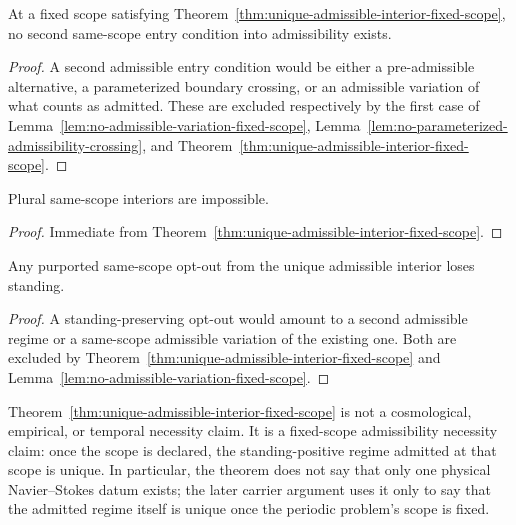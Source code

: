 \begin{corollary}\label{cor:no-alternative-entry-condition}
At a fixed scope satisfying Theorem~\ref{thm:unique-admissible-interior-fixed-scope}, no second same-scope entry condition into admissibility exists.
\end{corollary}

\begin{proof}
A second admissible entry condition would be either a pre-admissible alternative, a parameterized boundary crossing, or an admissible variation of what counts as admitted. These are excluded respectively by the first case of Lemma~\ref{lem:no-admissible-variation-fixed-scope}, Lemma~\ref{lem:no-parameterized-admissibility-crossing}, and Theorem~\ref{thm:unique-admissible-interior-fixed-scope}.
\end{proof}

\begin{corollary}\label{cor:no-plural-admissible-interiors}
Plural same-scope interiors are impossible.
\end{corollary}

\begin{proof}
Immediate from Theorem~\ref{thm:unique-admissible-interior-fixed-scope}.
\end{proof}

\begin{corollary}\label{cor:no-standing-preserving-optout}
Any purported same-scope opt-out from the unique admissible interior loses standing.
\end{corollary}

\begin{proof}
A standing-preserving opt-out would amount to a second admissible regime or a same-scope admissible variation of the existing one. Both are excluded by Theorem~\ref{thm:unique-admissible-interior-fixed-scope} and Lemma~\ref{lem:no-admissible-variation-fixed-scope}.
\end{proof}

\begin{remark}\label{rem:interpretive-boundary-fixed-scope}
Theorem~\ref{thm:unique-admissible-interior-fixed-scope} is not a cosmological, empirical, or temporal necessity claim. It is a fixed-scope admissibility necessity claim: once the scope is declared, the standing-positive regime admitted at that scope is unique. In particular, the theorem does not say that only one physical Navier--Stokes datum exists; the later carrier argument uses it only to say that the admitted regime itself is unique once the periodic problem's scope is fixed.
\end{remark}

